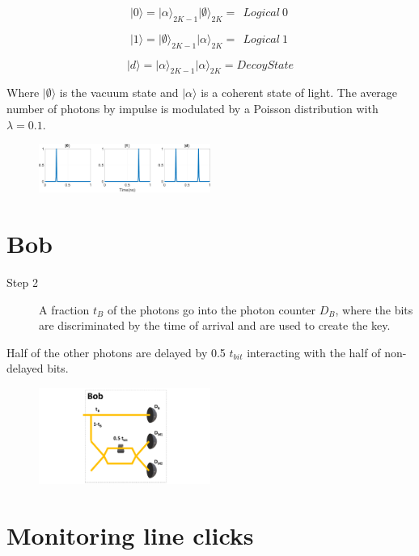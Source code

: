 \documentclass[1000pt]{article}
\newcommand{\mysection}[1]{\section*{\color{black}\sffamily #1}}%
\begin{document}
$$|0\rangle = |\alpha\rangle_{2K-1} |\emptyset\rangle_{2K} =\ \ Logical\ 0\ $$

$$|1\rangle = |\emptyset\rangle_{2K-1} |\alpha\rangle_{2K} =\ \ Logical\ 1\ $$

$$|d\rangle = |\alpha\rangle_{2K-1} |\alpha\rangle_{2K} = Decoy State$$

Where $|\emptyset\rangle$ is the vacuum state and $|\alpha\rangle$ is a coherent state of light. The average number of photons by impulse is modulated by a Poisson distribution with $\lambda=0.1$.

    \begin{figure}[hbt]
    	\centering
\includegraphics[width=0.5\textwidth]{./figures/S1.pdf}
        	\label{bob}
    \end{figure}





\mysection{\Huge\textbf{Bob}} \Large \vspace*{1cm}

\begin{description}
  \item[Step 2] A fraction $t_B$ of the photons go into the photon counter $D_B$, where the bits are discriminated by the time of arrival and are used to create the key.
\end{description}  

Half of the other photons are delayed by 0.5 $t_{bit}$ interacting with the half of non-delayed bits.
    \begin{figure}[hbt]
    	\centering
    	\includegraphics[width=0.5\textwidth]{./figures/B.pdf}
    \end{figure}
\mysection{\Huge\textbf{Monitoring line clicks}} \Large \vspace*{1cm}
\end{document}
